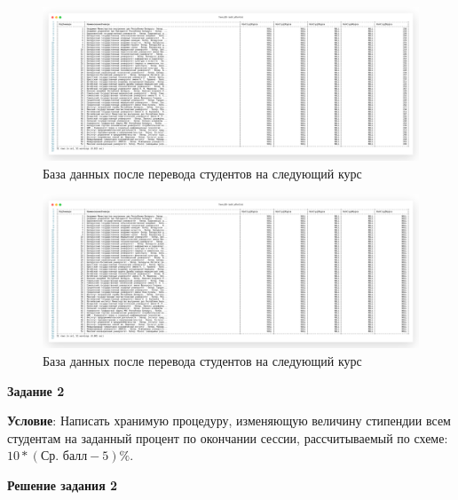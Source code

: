 \begin{figure}[!h]
  \centering

  \includegraphics[width=18cm]
  {../sql/task1/task1_after4.png}

  \caption{База данных после перевода студентов на следующий курс}

  \label{fig:task1_5}
\end{figure}

\begin{figure}[!h]
  \centering

  \includegraphics[width=18cm]
  {../sql/task1/task1_after5.png}

  \caption{База данных после перевода студентов на следующий курс}

  \label{fig:task1_6}
\end{figure}

\newpage

\begin{center}
  \textbf{Задание 2}
\end{center}

\textbf{Условие}:
Написать хранимую процедуру, изменяющую величину стипендии всем студентам на заданный процент по окончании сессии,
рассчитываемый по схеме:\\ $10 * (\text{Ср. балл} - 5)\%$.

\begin{center}
  \textbf{Решение задания 2}
\end{center}

